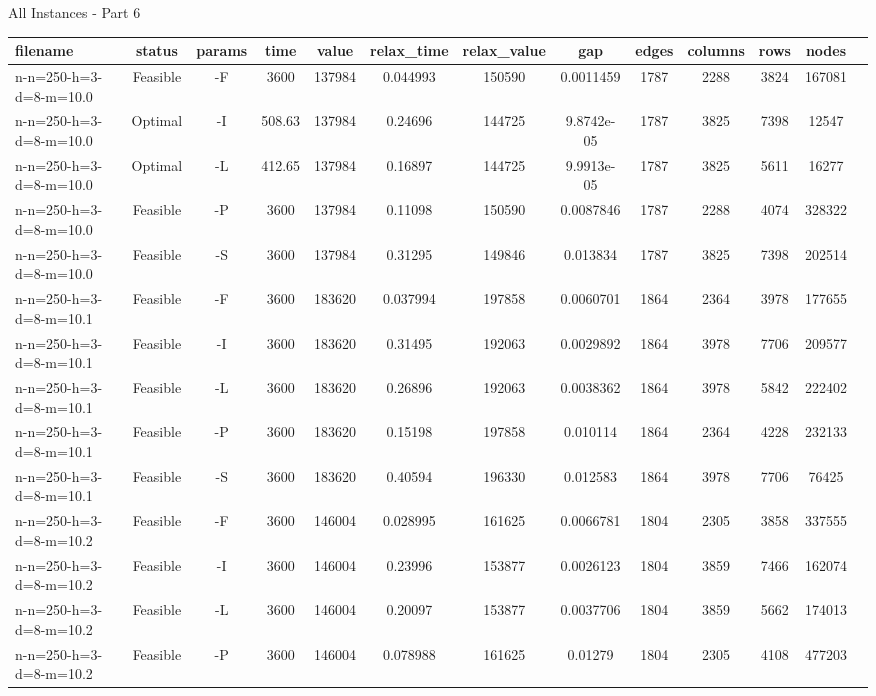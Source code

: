 \documentclass[landscape, a4paper]{article}
\begin{document}
\begin{center}
All Instances - Part 6

\begin{tabular}{lcccccccccccc}
filename & status & params & time & value & relax\_time & relax\_value & gap & edges & columns & rows & nodes & \\
\hline
n-n=250-h=3-d=8-m=10.0 & Feasible & -F & 3600 & 137984 & 0.044993 & 150590 & 0.0011459 & 1787 & 2288 & 3824 & 167081 & \\
n-n=250-h=3-d=8-m=10.0 & Optimal & -I & 508.63 & 137984 & 0.24696 & 144725 & 9.8742e-05 & 1787 & 3825 & 7398 & 12547 & \\
n-n=250-h=3-d=8-m=10.0 & Optimal & -L & 412.65 & 137984 & 0.16897 & 144725 & 9.9913e-05 & 1787 & 3825 & 5611 & 16277 & \\
n-n=250-h=3-d=8-m=10.0 & Feasible & -P & 3600 & 137984 & 0.11098 & 150590 & 0.0087846 & 1787 & 2288 & 4074 & 328322 & \\
n-n=250-h=3-d=8-m=10.0 & Feasible & -S & 3600 & 137984 & 0.31295 & 149846 & 0.013834 & 1787 & 3825 & 7398 & 202514 & \\
n-n=250-h=3-d=8-m=10.1 & Feasible & -F & 3600 & 183620 & 0.037994 & 197858 & 0.0060701 & 1864 & 2364 & 3978 & 177655 & \\
n-n=250-h=3-d=8-m=10.1 & Feasible & -I & 3600 & 183620 & 0.31495 & 192063 & 0.0029892 & 1864 & 3978 & 7706 & 209577 & \\
n-n=250-h=3-d=8-m=10.1 & Feasible & -L & 3600 & 183620 & 0.26896 & 192063 & 0.0038362 & 1864 & 3978 & 5842 & 222402 & \\
n-n=250-h=3-d=8-m=10.1 & Feasible & -P & 3600 & 183620 & 0.15198 & 197858 & 0.010114 & 1864 & 2364 & 4228 & 232133 & \\
n-n=250-h=3-d=8-m=10.1 & Feasible & -S & 3600 & 183620 & 0.40594 & 196330 & 0.012583 & 1864 & 3978 & 7706 & 76425 & \\
n-n=250-h=3-d=8-m=10.2 & Feasible & -F & 3600 & 146004 & 0.028995 & 161625 & 0.0066781 & 1804 & 2305 & 3858 & 337555 & \\
n-n=250-h=3-d=8-m=10.2 & Feasible & -I & 3600 & 146004 & 0.23996 & 153877 & 0.0026123 & 1804 & 3859 & 7466 & 162074 & \\
n-n=250-h=3-d=8-m=10.2 & Feasible & -L & 3600 & 146004 & 0.20097 & 153877 & 0.0037706 & 1804 & 3859 & 5662 & 174013 & \\
n-n=250-h=3-d=8-m=10.2 & Feasible & -P & 3600 & 146004 & 0.078988 & 161625 & 0.01279 & 1804 & 2305 & 4108 & 477203 & \\

\end{tabular}
\end{center}
\end{document}
